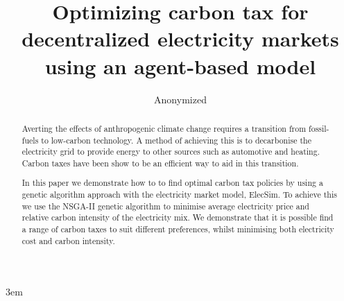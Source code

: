 \documentclass[sigconf]{acmart}
\begin{document}
\emergencystretch 3em

\title{Optimizing carbon tax for decentralized electricity markets using an agent-based model}

%
%
\author{Anonymized}
\renewcommand{\shortauthors}{Anonymized}

\begin{abstract}
 


Averting the effects of anthropogenic climate change requires a transition from fossil-fuels to low-carbon technology. A  method of achieving this is to decarbonise the electricity grid to provide energy to other sources such as automotive and heating. Carbon taxes have been show to be an efficient way to aid in this transition.


In this paper we demonstrate how to to find optimal carbon tax policies by using a genetic algorithm approach with the electricity market model, ElecSim. To achieve this we use the NSGA-II genetic algorithm to minimise average electricity price and relative carbon intensity of the electricity mix. We demonstrate that it is possible find a range of carbon taxes to suit different preferences, whilst minimising both electricity cost and carbon intensity.



 
\end{abstract}
\end{document}
